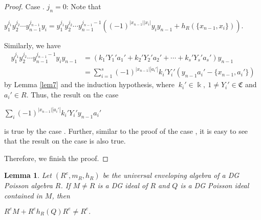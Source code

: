 \documentclass[a4paper,10pt]{amsart}
\newtheorem{lemma}[theorem]{Lemma}
\theoremstyle{definition}
\theoremstyle{remark}
\numberwithin{equation}{section}
\begin{document}
\begin{proof}
Case \uppercase\expandafter{}. $j_n=0$: Note that
\begin{center}
$y_1^{j_1}y_2^{j_2}\cdots y_{n-1}^{j_{n-1}}y_i=y_1^{j_1}y_2^{j_2}\cdots y_{n-1}^{j_{n-1}-1}((-1)^{|x_{n-1}||x_i|}y_iy_{n-1}+h_R(\{x_{n-1},
x_i\}))$.
\end{center}
Similarly, we have
\begin{align*}
y_1^{j_1}y_2^{j_2}\cdots y_{n-1}^{j_{n-1}-1}y_iy_{n-1}&=(k_1'Y_1'a_1'+k_2'Y_2'a_2'+\cdots+k_s'Y_s'a_s')y_{n-1}\\&=\sum_{i=1}^s(-1)^{|x_{n-1}||a_i'|}k_i'Y_i'(y_{n-1}a_i'-
\{x_{n-1}, a_i'\})
\end{align*}
by Lemma \ref{lem7} and the induction hypothesis, where $~k_i'\in \Bbbk, ~1\neq
Y_i'\in\mathfrak{C}$ and $a_i'\in R$.
Thus, the result on the case
\begin{center}
$\sum_i(-1)^{|x_{n-1}||a_i'|}k_i'Y_i'y_{n-1}a_i'$
\end{center}
is true by the case \uppercase\expandafter{}. Further, similar to the proof of the case \uppercase\expandafter{}, it is easy to see that the result on the case \uppercase\expandafter{} is also true.

Therefore, we finish the proof.
\end{proof}

\begin{lemma}\label{lem12}
Let $(R^{e}, m_R, h_R)$ be the universal enveloping algebra of a DG
Poisson algebra $R$. If $M\neq R$ is
a DG ideal of $R$ and $Q$ is a DG Poisson ideal contained in $M$,
then
\begin{center}
$R^{e}M+R^{e}h_R(Q)R^{e}\neq R^{e}.$
\end{center}
\end{lemma}
\end{document}
